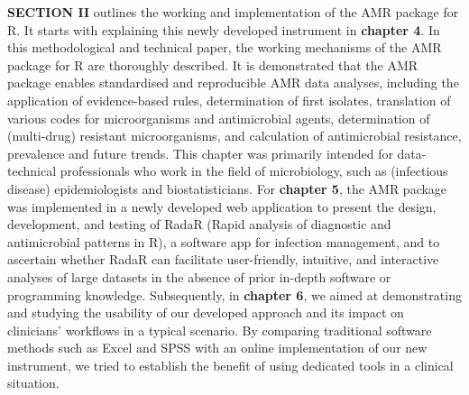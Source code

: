 \documentclass[
]{book}
\begin{document}
\textbf{SECTION II} outlines the working and implementation of the AMR package for R. It starts with explaining this newly developed instrument in \textbf{chapter 4}. In this methodological and technical paper, the working mechanisms of the AMR package for R are thoroughly described. It is demonstrated that the AMR package enables standardised and reproducible AMR data analyses, including the application of evidence-based rules, determination of first isolates, translation of various codes for microorganisms and antimicrobial agents, determination of (multi-drug) resistant microorganisms, and calculation of antimicrobial resistance, prevalence and future trends. This chapter was primarily intended for data-technical professionals who work in the field of microbiology, such as (infectious disease) epidemiologists and biostatisticians. For \textbf{chapter 5}, the AMR package was implemented in a newly developed web application to present the design, development, and testing of RadaR (Rapid analysis of diagnostic and antimicrobial patterns in R), a software app for infection management, and to ascertain whether RadaR can facilitate user-friendly, intuitive, and interactive analyses of large datasets in the absence of prior in-depth software or programming knowledge. Subsequently, in \textbf{chapter 6}, we aimed at demonstrating and studying the usability of our developed approach and its impact on clinicians' workflows in a typical scenario. By comparing traditional software methods such as Excel and SPSS with an online implementation of our new instrument, we tried to establish the benefit of using dedicated tools in a clinical situation.
\end{document}
